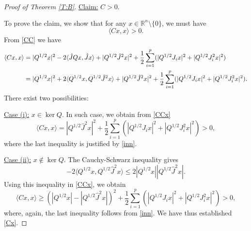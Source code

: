 \documentclass[11pt,letter]{amsart}
\newcommand{\Rn}{\mathbb R^n}
\numberwithin{equation}{section}
\newcommand{\sa}{\langle}
\newcommand{\da}{\rangle}
\numberwithin{equation}{section}
\begin{document}
\begin{proof}[Proof of Theorem \ref{T:B}]
\vskip 0.2in

\noindent \underline{Claim:} $C>0$.

\vskip 0.2in

\noindent To prove the claim, we show that for any $x\in \Rn\setminus\{0\}$, we must have
\begin{equation}\label{Cx}
\sa Cx,x\da > 0.
\end{equation}
From \eqref{CC} we have
\begin{align}\label{CCx}
\sa Cx,x\da & = |Q^{1/2}x|^2 - 2 \sa\hat{J}Qx,\hat J x\da  + |Q^{1/2} \hat J^2 x|^2 + \frac{1}{2}\sum_{i=1}^{p}(|Q^{1/2} J_{i}x|^2 + |Q^{1/2} J_i^2 x|^2)
\\
& = |Q^{1/2}x|^2 + 2 \sa Q^{1/2} x,Q^{1/2}\hat J^2 x\da  + |Q^{1/2} \hat J^2 x|^2 + \frac{1}{2}\sum_{i=1}^{p}(|Q^{1/2} J_{i}x|^2 + |Q^{1/2} J_i^2 x|^2).
\notag
\end{align}
There exist two possibilities:

\noindent \underline{Case (i):}  $x\in \ker Q$. In such case, we obtain from \eqref{CCx}
\[
\sa Cx,x\da = |Q^{1/2} \hat J^2 x|^2 + \frac{1}{2}\sum_{i=1}^{p}(|Q^{1/2} J_{i}x|^2 + |Q^{1/2} J_i^2 x|^2) > 0,
\]
where the last inequality is justified by \eqref{inn}.

\noindent \underline{Case (ii):} $x\not\in \ker Q$. The Cauchy-Schwarz inequality gives
\[
- 2 \sa Q^{1/2} x,Q^{1/2}\hat J^2 x\da \le 2 |Q^{1/2} x| |Q^{1/2}\hat J^2 x|.
\]
Using this inequality in \eqref{CCx}, we obtain
\[
\sa Cx,x\da \ge \left(|Q^{1/2} x| - |Q^{1/2}\hat J^2 x|\right)^2 + \frac{1}{2}\sum_{i=1}^{p}(|Q^{1/2} J_{i}x|^2 + |Q^{1/2} J_i^2 x|^2) > 0,
\]
where, again, the last inequality follows from  \eqref{inn}. We have thus established \eqref{Cx}.
 

\end{proof}
\end{document}
